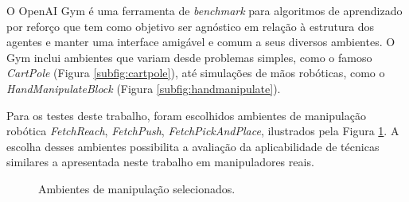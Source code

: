 O OpenAI Gym \cite{gym} é uma ferramenta de \textit{benchmark} para algoritmos de aprendizado por reforço que tem como objetivo ser agnóstico em relação à estrutura dos agentes e manter uma interface amigável e comum a seus diversos ambientes. O Gym inclui ambientes que variam desde problemas simples, como o famoso \textit{CartPole} (Figura \ref{subfig:cartpole}), até simulações de mãos robóticas, como o \textit{HandManipulateBlock} (Figura \ref{subfig:handmanipulate}).

Para os testes deste trabalho, foram escolhidos ambientes de manipulação robótica \textit{FetchReach}, \textit{FetchPush}, \textit{FetchPickAndPlace}, ilustrados pela Figura \ref{fig:fetchenvs}. A escolha desses ambientes possibilita a avaliação da aplicabilidade de técnicas similares a apresentada neste trabalho em manipuladores reais.

\begin{figure}[ht]
 \centering
   \captionsetup{width=1\textwidth}
   \caption{Ambientes de manipulação selecionados.}
  \label{fig:fetchenvs}
\end{figure}

